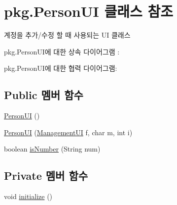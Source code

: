 \hypertarget{classpkg_1_1_person_u_i}{}\section{pkg.\+Person\+UI 클래스 참조}
\label{classpkg_1_1_person_u_i}


계정을 추가/수정 할 때 사용되는 UI 클래스  




pkg.\+Person\+U\+I에 대한 상속 다이어그램 \+: 


pkg.\+Person\+U\+I에 대한 협력 다이어그램\+:
\subsection*{Public 멤버 함수}
\begin{DoxyCompactItemize}
\item 
\hyperlink{classpkg_1_1_person_u_i_a0bdc2db82c46abebacf737e4004a2005}{Person\+UI} ()
\item 
\hyperlink{classpkg_1_1_person_u_i_a30128b150d6aafc846cbfcac3f1fc40a}{Person\+UI} (\hyperlink{classpkg_1_1_management_u_i}{Management\+UI} f, char m, int i)
\item 
boolean \hyperlink{classpkg_1_1_person_u_i_ac378af5584fc8f7bfddb1b05eb0f7289}{is\+Number} (String num)
\end{DoxyCompactItemize}
\subsection*{Private 멤버 함수}
\begin{DoxyCompactItemize}
\item 
void \hyperlink{classpkg_1_1_person_u_i_aa1f40468ad943a2162d4a0842238c3b0}{initialize} ()
\end{DoxyCompactItemize}
